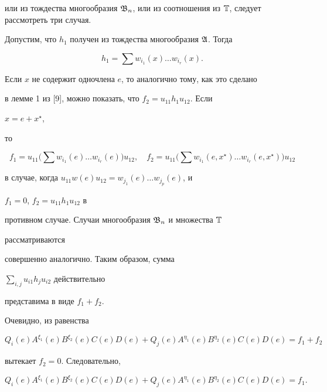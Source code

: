 или из тождества многообразия $\frak B_n$, или из соотношения из $\Bbb 


T$, следует рассмотреть три случая. 


 


Допустим, что $h_1$ получен из тождества многообразия $\frak A$. Тогда 


$$ 


h_1=\sum w_{i_1}(x)\dotsc w_{i_r}(x). 


$$ 


Если $x$ не содержит одночлена $e$, то аналогично тому, как это сделано  


в лемме 1 из [9], можно показать, что $f_2=u_{11}h_1u_{12}$. Если 


$x=e+x^\star$, 


то 


$$ 


f_1=u_{11}\Big(\sum w_{i_1}(e)\dotsc w_{i_r}(e)\Big)u_{12},\quad 


f_2=u_{11}\Big(\sum w_{i_1}(e,x^\star)\dotsc w_{i_r} 


(e,x^\star)\Big)u_{12} 


$$ 


в случае, когда $u_{11}w(e)u_{12}=w_{j_1}(e)\dotsc w_{j_p}(e)$, и 


$f_1=0$, $f_2=u_{11}h_1u_{12}$ в 


противном случае. Случаи многообразия $\frak B_n$ и множества $\Bbb T$ 


рассматриваются  


совершенно аналогично. Таким образом, сумма 


$\sum\limits_{i,j}u_{i1}h_j u_{i2}$ действительно  


представима в виде $f_1+f_2$. 


 


Очевидно, из равенства 


$$ 


Q_i(e)A^{\xi_1}(e)B^{\xi_2}(e)C(e)D(e)+Q_j (e)


A^{\eta_1}(e)B^{\eta_2}(e)C(e)D(e)=f_1+f_2 


$$ 


вытекает $f_2=0$. Следовательно, 


$$ 


Q_i(e)A^{\xi_1}(e)B^{\xi_2}(e)C(e)D(e)+Q_j (e)


A^{\eta_1}(e)B^{\eta_2}(e)C(e)D(e)=f_1. 


$$ 


